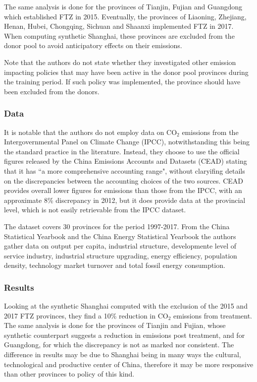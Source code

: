 \documentclass[12pt,a4paper,draft]{article}
\begin{document}
The same analysis is done for the provinces of Tianjin, Fujian and Guangdong 
which established FTZ in 2015. Eventually, the provinces of Liaoning, 
Zhejiang, Henan, Hubei, Chongqing, Sichuan and Shaanxi implemented FTZ in 2017.
When computing synthetic Shanghai, these provinces are excluded from the donor 
pool to avoid anticipatory effects on their emissions.

Note that the authors do not state whether they investigated other emission 
impacting policies that may have been active in the donor pool provinces 
during the training period. If such policy was implemented, the province should 
have been excluded from the donors. 


\subsubsection*{Data}
It is notable that the authors do not employ data on CO$_2$ emissions from the 
Intergovernmental Panel on Climate Change (IPCC), notwithstanding this being the 
standard practice in the literature. Instead, they choose to use the official 
figures released by the China Emissions Accounts and Datasets (CEAD) stating that 
it has ``a more comprehensive accounting range", without claryifing details on the 
discrepancies between the accounting choices of the two sources. CEAD provides 
overall lower figures for emissions than those from the IPCC, with an approximate 
8\% discrepancy in 2012, but it does provide data at the provincial level, which is 
not easily retrievable from the IPCC dataset.  

The dataset covers 30 provinces for the period 1997-2017. From the China Statistical 
Yearbook and the China Energy Statistical Yearbook the authors gather data on 
output per capita, industrial structure, developmente level of service industry, 
industrial structure upgrading, energy efficiency, population density, technology 
market turnover and total fossil energy consumption. 



\subsubsection*{Results}
Looking at the synthetic Shanghai computed with the exclusion of the 2015 and 2017 
FTZ provinces, they find a 10\% reduction in CO$_2$ emissions from treatment. 
The same analysis is done for the provinces of Tianjin and Fujian, whose synthetic 
counterpart suggests a reduction in emissions post treatment, and for Guangdong, 
for which the discrepancy is not as marked nor consistent. 
The difference in results may be due to Shanghai being in many ways the cultural, 
technological and productive center of China, therefore it may be more responsive 
than other provinces to policy of this kind. 
\end{document}
